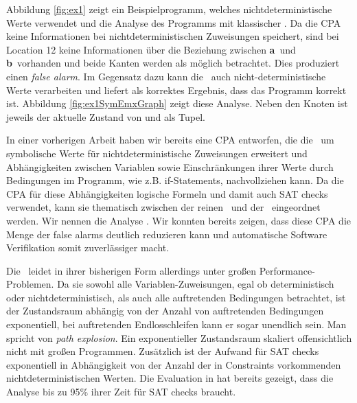 Abbildung \ref{fig:ex1} zeigt ein Beispielprogramm, welches nichtdeterministische Werte verwendet und die Analyse des Programms mit klassischer  .
Da die CPA keine Informationen bei nichtdeterministischen Zuweisungen speichert, sind bei Location 12 keine Informationen \"uber die Beziehung zwischen \textbf{a}\ und \textbf{b}\ vorhanden und beide Kanten werden als m\"oglich betrachtet. Dies produziert einen \emph{false alarm}.
Im Gegensatz dazu kann die \symbolicExecutionCPA\ auch nicht-deterministische Werte verarbeiten und liefert als korrektes Ergebnis, dass das Programm korrekt ist.
Abbildung \ref{fig:ex1SymEmxGraph} zeigt diese Analyse. Neben den Knoten ist jeweils der aktuelle Zustand von  und \constraintsCPA als Tupel.

In einer vorherigen Arbeit \cite{Lemberger2015} haben wir bereits eine CPA entworfen, die die \ um symbolische Werte f\"ur nichtdeterministische Zuweisungen erweitert
und Abh\"angigkeiten zwischen Variablen sowie Einschr\"ankungen ihrer Werte durch Bedingungen im Programm, wie z.B. if-Statements, nachvollziehen kann. Da die CPA f\"ur diese Abh\"angigkeiten logische Formeln und damit auch SAT checks verwendet, kann sie thematisch zwischen der reinen \ und der \predicateCPA\ eingeordnet werden. Wir nennen die Analyse \emph{\symbolicExecutionCPA}.
Wir konnten bereits zeigen, dass diese CPA die Menge der false alarms deutlich reduzieren kann und automatische Software Verifikation somit zuverl\"assiger macht.

Die \symbolicExecutionCPA\ leidet in ihrer bisherigen Form allerdings unter gro\ss en Performance-Problemen. Da sie sowohl alle Variablen-Zuweisungen, egal ob deterministisch oder nichtdeterministisch, als auch alle auftretenden Bedingungen betrachtet, ist der Zustandsraum abh\"angig von der Anzahl von auftretenden Bedingungen exponentiell, bei auftretenden Endlosschleifen kann er sogar unendlich sein. Man spricht von \emph{path explosion}.\cite{Anand2008} Ein exponentieller Zustandsraum skaliert offensichtlich nicht mit gro\ss en Programmen. Zus\"atzlich ist der Aufwand f\"ur SAT checks exponentiell in Abh\"angigkeit von der Anzahl der in Constraints vorkommenden nichtdeterministischen Werten.
Die Evaluation in \cite{Lemberger2015} hat bereits gezeigt, dass die Analyse bis zu 95\% ihrer Zeit f\"ur SAT checks braucht.

